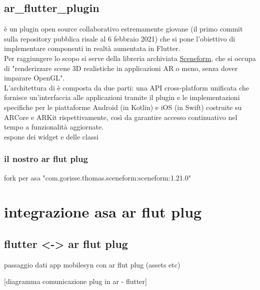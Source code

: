 \subsection{ar\_flutter\_plugin}
\label{subsec:ar_flutter_plugin}
\arplug{} è un plugin open source collaborativo estremamente giovane (il primo commit sulla repository pubblica risale al 6 febbraio 2021) che si pone l'obiettivo di implementare componenti in realtà aumentata in Flutter.\\
Per raggiungere lo scopo si serve della libreria archiviata \href{https://developers.google.com/sceneform/develop}{Sceneform}, che si occupa di "renderizzare scene 3D realistiche in applicazioni AR o meno, senza dover imparare OpenGL".\\
L'architettura di \arplug{} è composta da due parti: una API cross-platform unificata che fornisce un'interfaccia alle applicazioni tramite il plugin e le implementazioni specifiche per le piattaforme Android (in Kotlin) e iOS (in Swift) costruite su ARCore e ARKit rispettivamente, così da garantire accesso continuativo nel tempo a funzionalità aggiornate.\\
\arplug{} espone dei widget e delle classi 



\subsubsection{il nostro ar flut plug}
fork per asa 
"com.gorisse.thomas.sceneform:sceneform:1.21.0" 

\section{integrazione asa ar flut plug}
\label{sec:progettazione-onboarding-primo-login}


\subsection{flutter <-> ar flut plug}
\label{sec:autenticazione-tramite-auth0}
passaggio dati app mobilesyn con ar flut plug (assets etc)

[diagramma comunicazione plug in ar - flutter]


